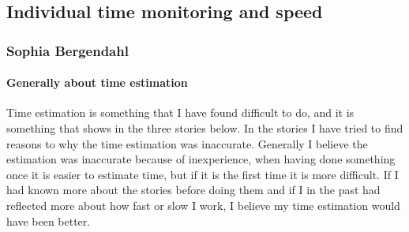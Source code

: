 \subsection{Individual time monitoring and speed}
\subsubsection{Sophia Bergendahl}

\paragraph{Generally about time estimation}
Time estimation is something that I have found difficult to do, and it is something that shows in the three stories below. In the stories I have tried to find reasons to why the time 
estimation was inaccurate. Generally I believe the estimation was inaccurate because of inexperience, when having done something once it is easier to estimate time, but if it is the first time it 
is more difficult. If I had known more about the stories before doing them and if I in the past had reflected more about how fast or slow I work, I believe my time estimation would have been 
better.



